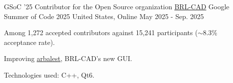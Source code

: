 

\begin{cventries}

  \cventry
    {GSoC '25 Contributor for the Open Source organization \underline{\href{https://github.com/BRL-CAD/brlcad}{BRL-CAD}}} %
    {Google Summer of Code 2025} %
    {United States, Online} %
    {May 2025 - Sep. 2025} %
    {
      \begin{cvitems} %
        \item {Among 1,272 accepted contributors against 15,241 participants ($\sim$8.3\% acceptance rate).}
        \item {Improving \underline{\href{https://github.com/BRL-CAD/arbalest}{arbalest}}, BRL-CAD's new GUI.}
        \item {Technologies used: C++, Qt6.}
      \end{cvitems}
    }

\end{cventries}
